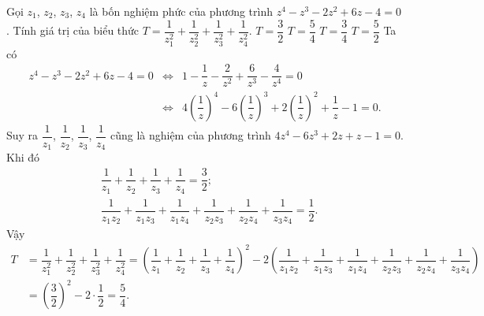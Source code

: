 \begin{ex}%
	Gọi $z_1$, $z_2$, $z_3$, $z_4$ là bốn nghiệm phức của phương trình $z^4-z^3-2z^2+6z-4=0$. Tính giá trị của biểu thức $T=\dfrac{1}{z_1^2}+\dfrac{1}{z_2^2}+\dfrac{1}{z_3^2}+\dfrac{1}{z_4^2}$.
	\choice
	{$T=\dfrac{3}{2}$}
	{\True $T=\dfrac{5}{4}$}
	{$T=\dfrac{3}{4}$}
	{$T=\dfrac{5}{2}$}
	\loigiai
	{
		Ta có
		\begin{eqnarray*}
			z^4-z^3-2z^2+6z-4=0 &\Leftrightarrow & 1-\dfrac{1}{z}-\dfrac{2}{z^2}+\dfrac{6}{z^3}-\dfrac{4}{z^4}=0\\
			&\Leftrightarrow & 4\left(\dfrac{1}{z}\right)^4-6\left(\dfrac{1}{z}\right)^3+2\left(\dfrac{1}{z}\right)^2+\dfrac{1}{z}-1=0.
		\end{eqnarray*}
		Suy ra $\dfrac{1}{z_1}$, $\dfrac{1}{z_2}$, $\dfrac{1}{z_3}$, $\dfrac{1}{z_4}$ cũng là nghiệm của phương trình $4z^4-6z^3+2z+z-1=0$.\\
		Khi đó
		\begin{align*}
		& \dfrac{1}{z_1}+\dfrac{1}{z_2}+\dfrac{1}{z_3}+\dfrac{1}{z_4}=\dfrac{3}{2};\\
		& \dfrac{1}{z_1z_2}+\dfrac{1}{z_1z_3}+\dfrac{1}{z_1z_4}+\dfrac{1}{z_2z_3}+\dfrac{1}{z_2z_4}+\dfrac{1}{z_3z_4}=\dfrac{1}{2}.
		\end{align*}
		Vậy
		\begin{align*}
		T &= \dfrac{1}{z_1^2}+\dfrac{1}{z_2^2}+\dfrac{1}{z_3^2}+\dfrac{1}{z_4^2}
		= \left(\dfrac{1}{z_1}+\dfrac{1}{z_2}+\dfrac{1}{z_3}+\dfrac{1}{z_4}\right)^2-2\left(\dfrac{1}{z_1z_2}+\dfrac{1}{z_1z_3}+\dfrac{1}{z_1z_4}+\dfrac{1}{z_2z_3}+\dfrac{1}{z_2z_4}+\dfrac{1}{z_3z_4}\right)\\
		&= \left(\dfrac{3}{2}\right)^2-2\cdot\dfrac{1}{2}=\dfrac{5}{4}.
		\end{align*}
	}
\end{ex}

